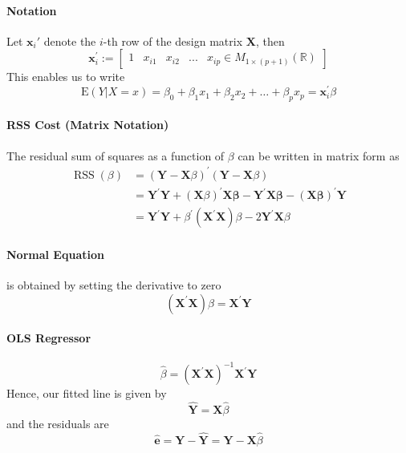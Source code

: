 \documentclass[11pt]{article}
\newcommand{\R}{\mathbb{R}}
\newcommand{\mat}[2]{M_{#1 \times #2}(\R)}
\newcommand{\bx}{\mathbf{x}}
\begin{document}
\paragraph{Notation} Let $\bx_i'$ denote the $i$-th row of the design matrix $\mathbf{X}$, then
\begin{equation*}
    \mathbf{x}_{i}^{\prime}:=\begin{bmatrix}
        1 & x_{i1} & x_{i2} & ... & x_{ip} \in \mat{1}{(p+1)}
    \end{bmatrix}
\end{equation*}
This enables us to write 
\begin{equation*}
    \mathrm{E}(Y | X=x)=\beta_{0}+\beta_{1} x_{1}+\beta_{2} x_{2}+\ldots+\beta_{p} x_{p}=\mathbf{x}_{i}^{\prime} \beta
\end{equation*}
\paragraph{RSS Cost (Matrix Notation)}
The residual sum of squares as a function of $\beta$ can be written in matrix form as
\begin{align*}
    \operatorname{RSS}(\beta)
    &=(\mathbf{Y}-\mathbf{X} \beta)^{\prime}(\mathbf{Y}-\mathbf{X} \beta) \\
    &= \mathbf{Y}^{\prime} \mathbf{Y}+(\mathbf{X} \beta)^{\prime} \mathbf{X} \boldsymbol{\beta}-\mathbf{Y}^{\prime} \mathbf{X} \boldsymbol{\beta}-(\mathbf{X} \boldsymbol{\beta})^{\prime} \mathbf{Y} \\
    &= \mathbf{Y}^{\prime} \mathbf{Y}+\beta^{\prime}\left(\mathbf{X}^{\prime} \mathbf{X}\right) \beta-2 \mathbf{Y}^{\prime} \mathbf{X} \beta
\end{align*}
\paragraph{Normal Equation} is obtained by setting the derivative to zero
\begin{equation*}
    \left(\mathbf{X}^{\prime} \mathbf{X}\right) \beta=\mathbf{X}^{\prime} \mathbf{Y}
\end{equation*}
\paragraph{OLS Regressor}
\begin{equation*}
    \hat{\beta}=\left(\mathbf{X}^{\prime} \mathbf{X}\right)^{-1} \mathbf{X}^{\prime} \mathbf{Y}
\end{equation*}
Hence, our fitted line is given by
\begin{equation*}
    \hat{\mathbf{Y}}=\mathbf{X} \hat{\beta}
\end{equation*}
and the residuals are
\begin{equation*}
    \hat{\mathbf{e}}=\mathbf{Y}-\hat{\mathbf{Y}}=\mathbf{Y}-\mathbf{X} \hat{\beta}
\end{equation*}
\end{document}

